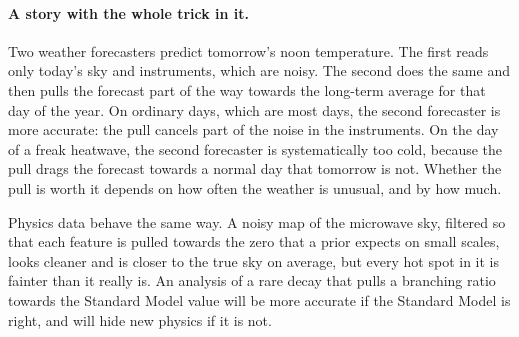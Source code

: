 \paragraph{A story with the whole trick in it.}
Two weather forecasters predict tomorrow's noon temperature. The first
reads only today's sky and instruments, which are noisy. The second does the
same and then pulls the forecast part of the way towards the long-term
average for that day of the year. On ordinary days, which are most days,
the second forecaster is more accurate: the pull cancels part of the noise
in the instruments. On the day of a freak heatwave, the second forecaster is
systematically too cold, because the pull drags the forecast towards a
normal day that tomorrow is not. Whether the pull is worth it depends on how
often the weather is unusual, and by how much.

Physics data behave the same way. A noisy map of the microwave sky, filtered
so that each feature is pulled towards the zero that a prior expects on
small scales, looks cleaner and is closer to the true sky on average, but
every hot spot in it is fainter than it really is. An analysis of a rare
decay that pulls a branching ratio towards the Standard Model value will be
more accurate if the Standard Model is right, and will hide new physics if
it is not.

